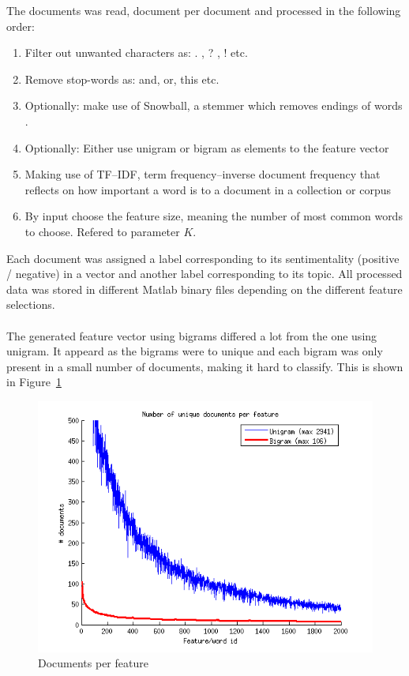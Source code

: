 The documents was read, document per document and processed in the following order: 
\begin{enumerate}
\item Filter out unwanted characters as: . , ? , ! etc.
\item Remove stop-words as: and, or, this etc.
\item Optionally: make use of Snowball, a stemmer which removes endings of words \citep{snowball_url}.
\item Optionally: Either use unigram or bigram as elements to the feature vector
\item Making use of TF–IDF, term frequency–inverse document frequency that
reflects on how important a word is to a document in a collection or corpus
\item By input choose the feature size, meaning the number of most common words to choose. Refered to parameter $K$.
\end{enumerate}
Each document was assigned a label corresponding to its sentimentality (positive / negative) in a vector and another label corresponding to its topic. All processed data was stored in different Matlab binary files depending on the different feature selections. 
\\\\
The generated feature vector using bigrams differed a lot from the one using unigram. It appeard as the bigrams were to unique and each bigram was only present in a small number of documents, making it hard to classify. This is shown in Figure~\ref{fig:docperfeature} 
\begin{figure}[h!]
\centering
\includegraphics[scale = 0.6]{../Plottar/documents_per_feature.png}
\caption{Documents per feature}
\label{fig:docperfeature}
\end{figure} 

